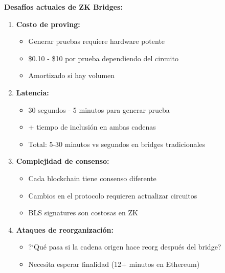 \documentclass[11pt,a4paper,twoside]{book}
\begin{document}
\begin{remark}
\textbf{Desaf\'ios actuales de ZK Bridges:}

\begin{enumerate}
    \item \textbf{Costo de proving:}
    \begin{itemize}
        \item Generar pruebas requiere hardware potente
        \item \$0.10 - \$10 por prueba dependiendo del circuito
        \item Amortizado si hay volumen
    \end{itemize}
    
    \item \textbf{Latencia:}
    \begin{itemize}
        \item 30 segundos - 5 minutos para generar prueba
        \item + tiempo de inclusi\'on en ambas cadenas
        \item Total: 5-30 minutos vs segundos en bridges tradicionales
    \end{itemize}
    
    \item \textbf{Complejidad de consenso:}
    \begin{itemize}
        \item Cada blockchain tiene consenso diferente
        \item Cambios en el protocolo requieren actualizar circuitos
        \item BLS signatures son costosas en ZK
    \end{itemize}
    
    \item \textbf{Ataques de reorganizaci\'on:}
    \begin{itemize}
        \item ?`Qu\'e pasa si la cadena origen hace reorg despu\'es del bridge?
        \item Necesita esperar finalidad (12+ minutos en Ethereum)
    \end{itemize}
\end{enumerate}
\end{remark}
\end{document}

